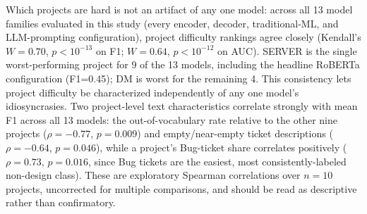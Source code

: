 \documentclass[preprint,12pt]{elsarticle}
\begin{document}
Which projects are hard is not an artifact of any one model: across all 13 model families evaluated in this study (every encoder, decoder, traditional-ML, and LLM-prompting configuration), project difficulty rankings agree closely (Kendall's $W=0.70$, $p<10^{-13}$ on F1; $W=0.64$, $p<10^{-12}$ on AUC). SERVER is the single worst-performing project for 9 of the 13 models, including the headline RoBERTa configuration (F1=0.45); DM is worst for the remaining 4. This consistency lets project difficulty be characterized independently of any one model's idiosyncrasies. Two project-level text characteristics correlate strongly with mean F1 across all 13 models: the out-of-vocabulary rate relative to the other nine projects ($\rho=-0.77$, $p=0.009$) and empty/near-empty ticket descriptions ($\rho=-0.64$, $p=0.046$), while a project's Bug-ticket share correlates positively ($\rho=0.73$, $p=0.016$, since Bug tickets are the easiest, most consistently-labeled non-design class). These are exploratory Spearman correlations over $n=10$ projects, uncorrected for multiple comparisons, and should be read as descriptive rather than confirmatory.
\end{document}
